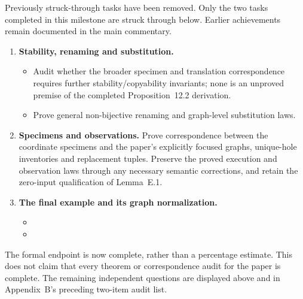 Previously struck-through tasks have been removed. Only the two tasks
completed in this milestone are struck through below. Earlier achievements
remain documented in the main commentary.
\begin{enumerate}
\item \textbf{Stability, renaming and substitution.}
\begin{itemize}
\item Audit whether the broader specimen and translation correspondence
requires further stability/copyability invariants; none is an unproved
premise of the completed Proposition~12.2 derivation.
\item Prove general non-bijective renaming and graph-level substitution laws.
\end{itemize}
\item \textbf{Specimens and observations.}
Prove correspondence between the coordinate specimens and the paper's
explicitly focused graphs, unique-hole inventories and replacement tuples.
Preserve the proved execution and observation laws through any necessary
semantic corrections, and retain the zero-input qualification of Lemma~E.1.
\item \textbf{The final example and its graph normalization.}
\begin{itemize}
\item {\raggedright{}\par}
\item {\raggedright{}\par}
\end{itemize}
\end{enumerate}
The formal endpoint is now complete, rather than a percentage estimate.
This does not claim that every theorem or correspondence audit for the paper
is complete. The remaining independent questions are displayed above and in
Appendix~B's preceding two-item audit list.
